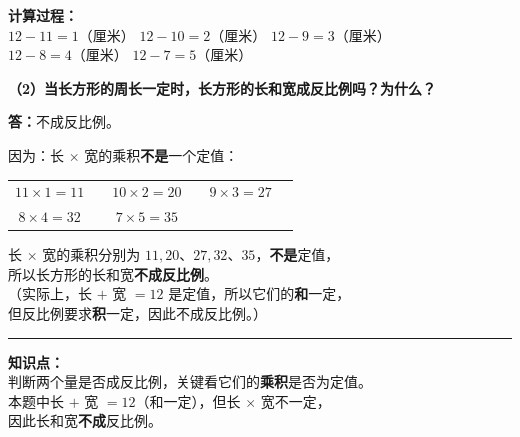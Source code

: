 \vspace{0.4cm}

{
\small\color{gray}
\textbf{计算过程：}\\
$12 - 11 = 1$（厘米）\quad
$12 - 10 = 2$（厘米）\quad
$12 - 9 = 3$（厘米）\\
$12 - 8 = 4$（厘米）\quad\;
$12 - 7 = 5$（厘米）
}

\vspace{1cm}

\noindent\textbf{（2）当长方形的周长一定时，长方形的长和宽成反比例吗？为什么？}

\vspace{0.4cm}

\noindent
\textbf{答：}不成反比例。

\vspace{0.3cm}

\noindent
因为：长 $\times$ 宽的乘积\textbf{不是}一个定值：

\vspace{0.2cm}

\begin{center}
\renewcommand{\arraystretch}{1.6}
\begin{tabular}{cccccc}
$11 \times 1 = 11$ & \quad &
$10 \times 2 = 20$ & \quad &
$9 \times 3 = 27$ \\[4pt]
$8 \times 4 = 32$ & \quad &
$7 \times 5 = 35$ & & \\
\end{tabular}
\end{center}

\vspace{0.3cm}

\noindent
长 $\times$ 宽的乘积分别为 $11, 20$、$27, 32$、$35$，\textbf{不是}定值，\\[4pt]
所以长方形的长和宽\textbf{\textcolor{red!70!black}{不成反比例}}。\\[8pt]
（实际上，长 $+$ 宽 $= 12$ 是定值，所以它们的\textbf{和}一定，\\[2pt]
\phantom{（}但反比例要求\textbf{积}一定，因此不成反比例。）

\vspace{1cm}
\hrule
\vspace{0.4cm}

{\small\color{gray}
\textbf{知识点：}\\
判断两个量是否成反比例，关键看它们的\textbf{乘积}是否为定值。\\
本题中长 $+$ 宽 $= 12$（和一定），但长 $\times$ 宽不一定，\\
因此长和宽\textbf{不成}反比例。
}


